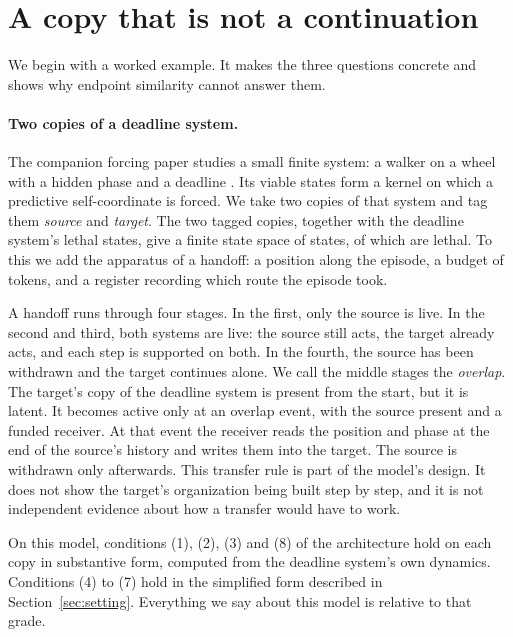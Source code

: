 \section{A copy that is not a continuation}
\label{sec:copy}

We begin with a worked example. It makes the three questions concrete and
shows why endpoint similarity cannot answer them.

\paragraph{Two copies of a deadline system.}
The companion forcing paper studies a small finite system: a walker on a wheel
with a hidden phase and a deadline \citep{TsiokosForcing2026}. Its viable
states form a kernel on which a predictive self-coordinate is forced. We take
two copies of that system and tag them \emph{source} and \emph{target}. The
two tagged copies, together with the deadline system's lethal states, give a
finite state space of \snapPosZeroFourTaggedAmbientStates{} states, of which
\snapPosZeroFourTaggedLethalStates{} are lethal. To this we add the apparatus
of a handoff: a position along the episode, a budget of tokens, and a register
recording which route the episode took.

A handoff runs through four stages. In the first, only the source is live. In
the second and third, both systems are live: the source still acts, the target
already acts, and each step is supported on both. In the fourth, the source
has been withdrawn and the target continues alone. We call the middle stages
the \emph{overlap}. The target's copy of the deadline system is present from
the start, but it is latent. It becomes active only at an overlap event, with
the source present and a funded receiver. At that event the receiver reads the
position and phase at the end of the source's history and writes them into
the target. The
source is withdrawn only afterwards. This transfer rule is part of the model's
design. It does not show the target's organization being built step by step,
and it is not independent evidence about how a transfer would have to work.

On this model, conditions (1), (2), (3) and (8) of the architecture hold on
each copy in substantive form, computed from the deadline system's own
dynamics. Conditions (4) to (7) hold in the simplified form described in
Section~\ref{sec:setting}. Everything we say about this model is relative to
that grade.


